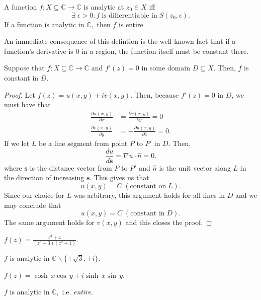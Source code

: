 \documentclass[12pt]{book}
\begin{document}
\begin{defn}
    A function $f: X \subseteq \mathbb{C} \rightarrow \mathbb{C}$ is analytic at $z_0 \in X$ iff
    \[
        \exists\; \epsilon > 0: f\; \text{is differentiable in}\; S(z_0, \epsilon).
    \] 
    If a function is analytic in $\mathbb{C},$ then $f$ is entire.
\end{defn}

An immediate consequence of this defintion is the well known fact that if a function's derivative is 0 in a region, the function itself must be constant there.
\begin{thm}
    Suppose that $f: X \subseteq \mathbb{C} \rightarrow \mathbb{C}$ and $f'(z) = 0$ in some domain $D \subseteq X.$ Then, 
    $f$ is constant in $D.$
\end{thm}
\begin{proof}
    Let $f(z) = u(x, y) + iv(x, y).$ Then, because $f'(z) = 0$ in $D$, we must have that 
    \begin{align*}
        \frac{\partial u(x, y)}{\partial x} &= \frac{\partial v(x, y)}{\partial y} = 0 \\
        \frac{\partial v(x, y)}{\partial y} &= -\frac{\partial u(x, y)}{\partial x} = 0.
    \end{align*}
    If we let $L$ be a line segment from point $P$ to $P'$ in $D.$ Then,
    \[
        \frac{du}{d\mathbf{s}} = \nabla u \cdot \hat{n} = 0.
    \]
    where $\mathbf{s}$ is the distance vector from $P$ to $P'$ and $\hat{n}$ is the unit vector along $L$ in the direction of increasing $\mathbf{s}$.
    This gives us that 
    \[
        u(x, y) = C\; (\text{constant on}\; L).
    \]
    Since our choice for $L$ was arbitrary, this argument holds for all lines in $D$ and we may conclude that 
    \[
        u(x, y) = C\; (\text{constant in}\; D).
    \]
    The same argument holds for $v(x, y)$ and this closes the proof.
\end{proof}

\begin{exmp}
    $f(z) = \frac{z^3 + 4}{(z^3 - 3)(z^2 + 1)}.$  
\end{exmp}
$f$ is analytic in $\mathbb{C} \backslash \{\pm\sqrt{3}, \pm i\}.$


\begin{exmp}
    $f(z) = \cosh\,x\cos\,y + i \sinh\,x\sin\,y.$  
\end{exmp}
$f$ is analytic in $\mathbb{C},$ i.e. \textit{entire}.
\end{document}
